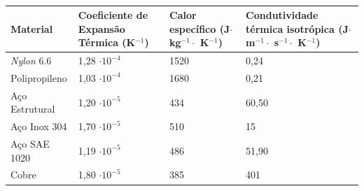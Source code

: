 \begin{table}[H]
    \centering
    \caption{}
    \label{tab:Propriedadestermicas}
    \begin{adjustbox}{max width = \textwidth}
        \begin{tabular}{|C{3.5cm}|C{4cm}|C{3.5cm}|C{4cm}|}
            \hline
            \textbf{Material} & \textbf{Coeficiente de Expansão Térmica \qquad  (K$^{-1}$)} & \textbf{Calor específico (J$\cdot$ kg$^{-1}\cdot$ K$^{-1}$)} & \textbf{Condutividade térmica isotrópica (J$\cdot$m$^{-1}\cdot$ s$^{-1}\cdot$ K$^{-1}$)} \\ \hline
              \textit{Nylon} 6.6 & 1,28 $\cdot10^{-4} $ & 1520 & 0,24 \\ \hline
              Polipropileno & 1,03 $\cdot10^{-4} $ & 1680 & 0,21 \\ \hline
              Aço Estrutural  & 1,20 $\cdot10^{-5} $ & 434 & 60,50 \\ \hline
              Aço Inox 304  & 1,70 $\cdot10^{-5} $ & 510 & 15 \\ \hline
              Aço SAE 1020  & 1,19 $\cdot10^{-5}$ & 486 & 51,90 \\ \hline
              Cobre  & 1,80 $\cdot10^{-5} $ & 385 & 401 \\\hline
             
        \end{tabular}
    \end{adjustbox}
\end{table}


